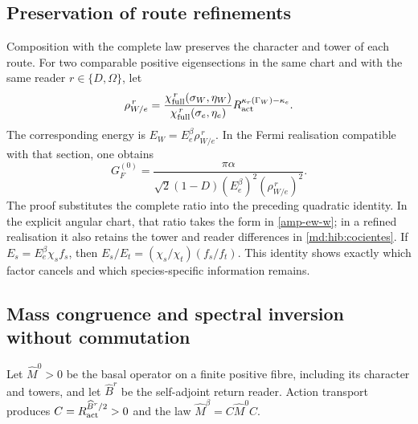 \subsection{Preservation of route refinements}
\label{amp-ew-refinamiento}
Composition with the complete law preserves the character and tower
of each route. For two comparable positive eigensections in the same
chart and with the same reader $r\in\{D,\Omega\}$, let
\begin{equation}
 \rho_{W/e}^{\,r}
 =\frac{\chi_{\rm full}^{\,r}(\sigma_W,\eta_W)}
        {\chi_{\rm full}^{\,r}(\sigma_e,\eta_e)}
 R_{\rm act}^{\kappa_r(\Gamma_W)-\kappa_e}.
 \label{amp-ew-razon-completa}
\end{equation}
The corresponding energy is $E_W=E_e^\beta\rho_{W/e}^{\,r}$.
In the Fermi realisation compatible with that section, one obtains
\begin{equation}
 G_F^{(0)}=
 \frac{\pi\alpha}
 {\sqrt2(1-D)(E_e^\beta)^2(\rho_{W/e}^{\,r})^2}.
 \label{amp-ew-fermi-completo}
\end{equation}
The proof substitutes the complete ratio into the preceding quadratic
identity. In the explicit angular chart, that ratio takes the form in
\eqref{amp-ew-w}; in a refined realisation it also retains the tower
and reader differences in \eqref{md:hib:cocientes}.
If $E_s=E_e^\beta\chi_sf_s$, then
$E_s/E_t=(\chi_s/\chi_t)(f_s/f_t)$. This identity shows exactly
which factor cancels and which species-specific information remains.

\subsection{Mass congruence and spectral inversion without commutation}
\label{amp-ew-congruencia}
Let $\widehat M^0>0$ be the basal operator on a finite positive fibre,
including its character and towers, and let $\widehat B^r$ be the
self-adjoint return reader. Action transport produces
$C=R_{\rm act}^{\widehat B^r/2}>0$ and the law
$\widehat M^\beta=C\widehat M^0C$.

